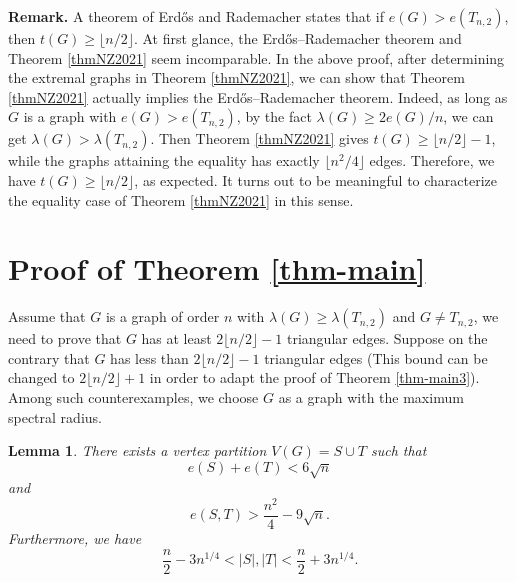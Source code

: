 \documentclass[11pt]{article}
\newtheorem{lemma}[theorem]{Lemma}
\begin{document}
\noindent 
{\bf Remark.} 
A theorem of Erd\H{o}s and Rademacher \cite{Erd1955,Erdos1964} states that 
if $e(G)> e(T_{n,2})$, then  $t(G)\ge \lfloor {n}/{2}\rfloor$.  
At first glance, the Erd\H{o}s--Rademacher theorem and Theorem \ref{thmNZ2021} seem incomparable. 
In the above proof, after determining the extremal graphs in 
 Theorem \ref{thmNZ2021}, we can show that 
 Theorem \ref{thmNZ2021} actually implies the Erd\H{o}s--Rademacher theorem. 
 Indeed, as long as $G$ is a graph with $e(G)> e(T_{n,2})$, 
 by the fact  $\lambda (G)\ge 2e(G)/n$,  we can get $\lambda (G)> \lambda (T_{n,2})$. 
Then Theorem \ref{thmNZ2021} gives $t(G)\ge \lfloor {n}/{2}\rfloor -1$, 
 while the graphs attaining the equality has exactly $\lfloor {n^2}/{4}\rfloor$ edges. Therefore, we have $t(G)\ge \lfloor {n}/{2}\rfloor $, as expected. 
It turns out to be meaningful to characterize  
the equality case of Theorem \ref{thmNZ2021}
in this sense. 







\section{Proof of Theorem \ref{thm-main}}

\label{sec5}

Assume that $G$ is a graph of order $n$ with 
$\lambda (G) \ge \lambda (T_{n,2})$ and $G\neq T_{n,2}$, 
we need to prove that $G$ has 
at least  $2\lfloor n/2\rfloor -1$ triangular edges. 
Suppose on the contrary that 
$G$ has less than $2\lfloor n/2\rfloor -1$ triangular edges 
(This bound can be changed to $2\lfloor n/2\rfloor +1$ 
in order to adapt the proof of Theorem \ref{thm-main3}). 
Among such counterexamples, we choose $G$ as a graph 
with the maximum spectral radius.  



\begin{lemma}\label{lem-partition}
There exists a vertex partition  $V(G)=S\cup T$ such that 
\[ e(S) + e(T)< 6\sqrt{n} \]
and 
$$e(S, T)> \frac{n^2}{4} - 9\sqrt{n}. $$
Furthermore, we have 
\[
\frac{n}{2} - 3n^{1/4} < |S|, |T| < 
\frac{n}{2} + 3n^{1/4}.
\]
\end{lemma}
\end{document}
